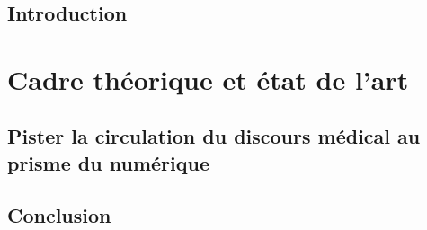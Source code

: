 \documentclass[a4paper,12pt]{book}
\begin{document}
\renewcommand{\arraystretch}{1.5}


~
\thispagestyle{empty}
\setcounter{page}{0}
\newpage



\chapter{Introduction}







%

\part{Cadre théorique et état de l’art}



\chapter{Pister la circulation du discours médical au prisme du numérique}



%

%
%
%
\chapter{Conclusion}



\newpage

\nocite{*}

%






\end{document}
